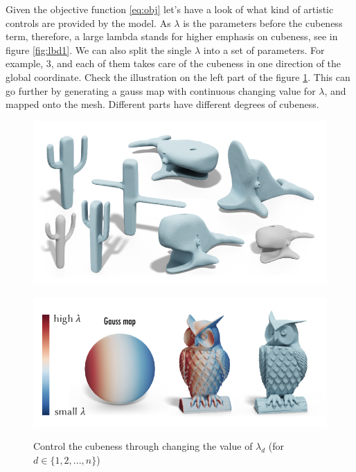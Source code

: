 \documentclass[a4paper,10pt]{article}
\begin{document}
Given the objective function \ref{eq:obj} let's have a look of what kind of artistic controls are provided by the model. As $\lambda$ is the parameters before the cubeness term, therefore, a large lambda stands for higher emphasis on cubeness, see in figure \ref{fig:lbd1}. We can also split the single $\lambda$ into a set of parameters. For example, 3, and each of them takes care of the cubeness in one direction of the global coordinate. Check the illustration on the left part of the figure \ref{fig:lbd4}. This can go further by generating a gauss map with continuous changing value for $\lambda$, and mapped onto the mesh. Different parts have different degrees of cubeness.
	\begin{figure}[ht!]
		\centering
		\begin{minipage}[t]{.45\textwidth}
			  \centering
			  \includegraphics[width=\linewidth]{figures/lambda2}
			  \label{fig:lbd2}
		\end{minipage}%
		\begin{minipage}[t]{.55\textwidth}
			  \centering
			  \includegraphics[width=0.9\linewidth]{figures/lambda3}
			  \label{fig:lbd3}
		\end{minipage}
		\caption{Control the cubeness through changing the value of $\lambda_d$ (for $d\in\{1,2,...,n\}$)}
		\label{fig:lbd4}
	\end{figure}
\end{document}
